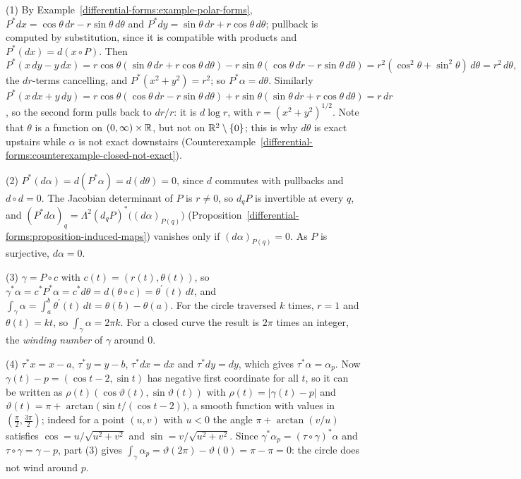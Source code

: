 \begin{solution}
(1) By Example~\ref{differential-forms:example-polar-forms}, $P^*dx = \cos\theta\,dr - r\sin\theta\,d\theta$ and $P^*dy = \sin\theta\,dr + r\cos\theta\,d\theta$; pullback is computed by substitution, since it is
compatible with products and $P^*(dx) = d(x \circ P)$. Then
\[
P^*(x\,dy - y\,dx) = r\cos\theta(\sin\theta\,dr + r\cos\theta\,d\theta) - r\sin\theta(\cos\theta\,dr - r\sin\theta\,d\theta) = r^2(\cos^2\theta + \sin^2\theta)\,d\theta = r^2\,d\theta,
\]
the $dr$-terms cancelling, and $P^*(x^2 + y^2) = r^2$; so $P^*\alpha = d\theta$. Similarly
$P^*(x\,dx + y\,dy) = r\cos\theta(\cos\theta\,dr - r\sin\theta\,d\theta) + r\sin\theta(\sin\theta\,dr + r\cos\theta\,d\theta) = r\,dr$, so the second form pulls back to $dr/r$: it is $d\log r$, with
$r = (x^2 + y^2)^{1/2}$. Note that $\theta$ is a function on $(0, \infty) \times \mathbb{R}$, but not on $\mathbb{R}^2 \setminus \{0\}$; this is why $d\theta$ is exact upstairs while $\alpha$ is not exact downstairs
(Counterexample~\ref{differential-forms:counterexample-closed-not-exact}).

(2) $P^*(d\alpha) = d(P^*\alpha) = d(d\theta) = 0$, since $d$ commutes with pullbacks and $d \circ d = 0$. The Jacobian determinant of $P$ is $r \neq 0$, so $d_qP$ is invertible at every $q$, and
$(P^*d\alpha)_q = \Lambda^2(d_qP)^*\bigl((d\alpha)_{P(q)}\bigr)$ (Proposition~\ref{differential-forms:proposition-induced-maps}) vanishes only if $(d\alpha)_{P(q)} = 0$. As $P$ is surjective, $d\alpha = 0$.

(3) $\gamma = P \circ c$ with $c(t) = (r(t), \theta(t))$, so $\gamma^*\alpha = c^*P^*\alpha = c^*d\theta = d(\theta \circ c) = \theta^{\prime}(t)\,dt$, and $\int_\gamma\alpha = \int_a^b\theta^{\prime}(t)\,dt = \theta(b) - \theta(a)$. For the
circle traversed $k$ times, $r = 1$ and $\theta(t) = kt$, so $\int_\gamma\alpha = 2\pi k$. For a closed curve the result is $2\pi$ times an integer, the \emph{winding number} of $\gamma$ around $0$.

(4) $\tau^*x = x - a$, $\tau^*y = y - b$, $\tau^*dx = dx$ and $\tau^*dy = dy$, which gives $\tau^*\alpha = \alpha_p$. Now $\gamma(t) - p = (\cos t - 2, \sin t)$ has negative first coordinate for all $t$, so it can be written
as $\rho(t)(\cos\vartheta(t), \sin\vartheta(t))$ with $\rho(t) = |\gamma(t) - p|$ and $\vartheta(t) = \pi + \arctan\bigl(\sin t/(\cos t - 2)\bigr)$, a smooth function with values in $(\frac\pi2, \frac{3\pi}2)$; indeed for a point
$(u, v)$ with $u < 0$ the angle $\pi + \arctan(v/u)$ satisfies $\cos = u/\sqrt{u^2 + v^2}$ and $\sin = v/\sqrt{u^2 + v^2}$. Since $\gamma^*\alpha_p = (\tau \circ \gamma)^*\alpha$ and $\tau \circ \gamma = \gamma - p$, part (3)
gives $\int_\gamma\alpha_p = \vartheta(2\pi) - \vartheta(0) = \pi - \pi = 0$: the circle does not wind around $p$.
\end{solution}
